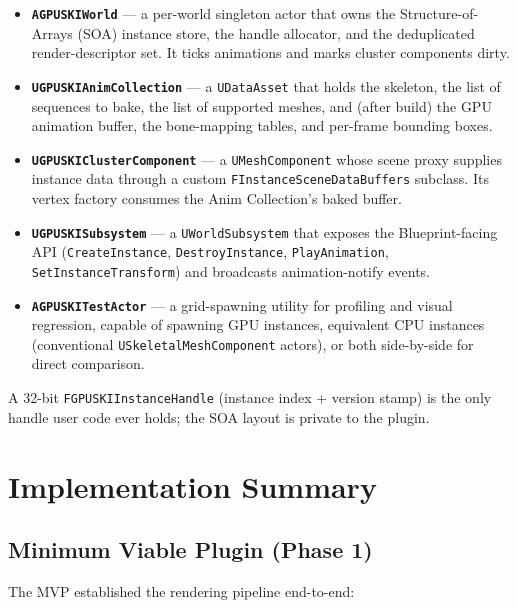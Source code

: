 \documentclass[11pt, a4paper]{article}
\begin{document}
\begin{itemize}[leftmargin=1.5em]
    \item \textbf{\texttt{AGPUSKIWorld}} --- a per-world singleton actor that owns the Structure-of-Arrays (SOA) instance store, the handle allocator, and the deduplicated render-descriptor set. It ticks animations and marks cluster components dirty.
    \item \textbf{\texttt{UGPUSKIAnimCollection}} --- a \texttt{UDataAsset} that holds the skeleton, the list of sequences to bake, the list of supported meshes, and (after build) the GPU animation buffer, the bone-mapping tables, and per-frame bounding boxes.
    \item \textbf{\texttt{UGPUSKIClusterComponent}} --- a \texttt{UMeshComponent} whose scene proxy supplies instance data through a custom \texttt{FInstance\-Scene\-Data\-Buffers} subclass. Its vertex factory consumes the Anim Collection's baked buffer.
    \item \textbf{\texttt{UGPUSKISubsystem}} --- a \texttt{UWorldSubsystem} that exposes the Blueprint-facing API (\texttt{CreateInstance}, \texttt{DestroyInstance}, \texttt{PlayAnimation}, \texttt{SetInstanceTransform}) and broadcasts animation-notify events.
    \item \textbf{\texttt{AGPUSKITestActor}} --- a grid-spawning utility for profiling and visual regression, capable of spawning GPU instances, equivalent CPU instances (conventional \texttt{USkeletalMeshComponent} actors), or both side-by-side for direct comparison.
\end{itemize}

A 32-bit \texttt{FGPUSKIInstanceHandle} (instance index + version stamp) is the only handle user code ever holds; the SOA layout is private to the plugin.

\section{Implementation Summary}

\subsection{Minimum Viable Plugin (Phase 1)}

The MVP established the rendering pipeline end-to-end:
\end{document}
